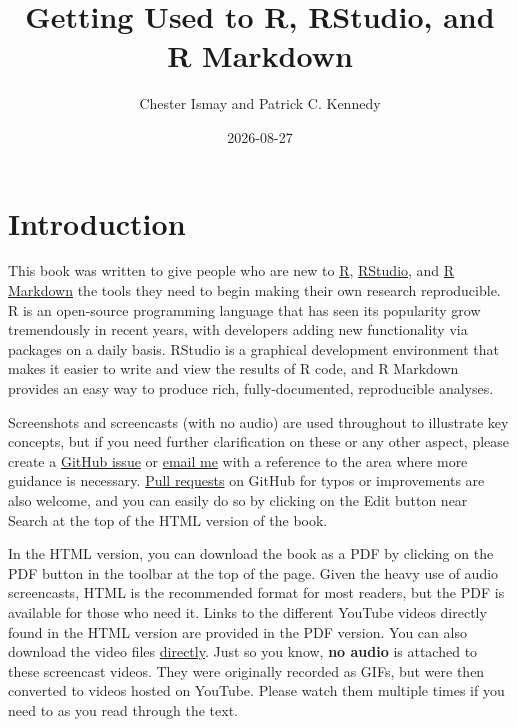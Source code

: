 \documentclass[]{tufte-book}
\title{Getting Used to R, RStudio, and R Markdown}
\author{Chester Ismay and Patrick C. Kennedy}
\date{2026-08-27}
\begin{document}
\maketitle



{
\setcounter{tocdepth}{1}
\tableofcontents
}

\chapter{Introduction}\label{intro}

This book was written to give people who are new to \href{https://www.r-project.org}{R}, \href{https://posit.co/downloads/}{RStudio}, and \href{http://rmarkdown.rstudio.com}{R Markdown} the tools they need to begin making their own research reproducible. R is an open-source programming language that has seen its popularity grow tremendously in recent years, with developers adding new functionality via packages on a daily basis. RStudio is a graphical development environment that makes it easier to write and view the results of R code, and R Markdown provides an easy way to produce rich, fully-documented, reproducible analyses.

Screenshots and screencasts (with no audio) are used throughout to illustrate key concepts, but if you need further clarification on these or any other aspect, please create a \href{https://github.com/ismayc/rbasics-book/issues}{GitHub issue} or \href{mailto:chester.ismay@gmail.com}{email me} with a reference to the area where more guidance is necessary. \href{https://code.tutsplus.com/courses/git-basics-github-pull-requests}{Pull requests} on GitHub for typos or improvements are also welcome, and you can easily do so by clicking on the Edit button near Search at the top of the HTML version of the book.

In the HTML version, you can download the book as a PDF by clicking on the PDF button in the toolbar at the top of the page. Given the heavy use of audio screencasts, HTML is the recommended format for most readers, but the PDF is available for those who need it. Links to the different YouTube videos directly found in the HTML version are provided in the PDF version. You can also download the video files \href{https://github.com/ismayc/rbasics-book/tree/master/mp4}{directly}. Just so you know, \textbf{no audio} is attached to these screencast videos. They were originally recorded as GIFs, but were then converted to videos hosted on YouTube. Please watch them multiple times if you need to as you read through the text.
\end{document}
